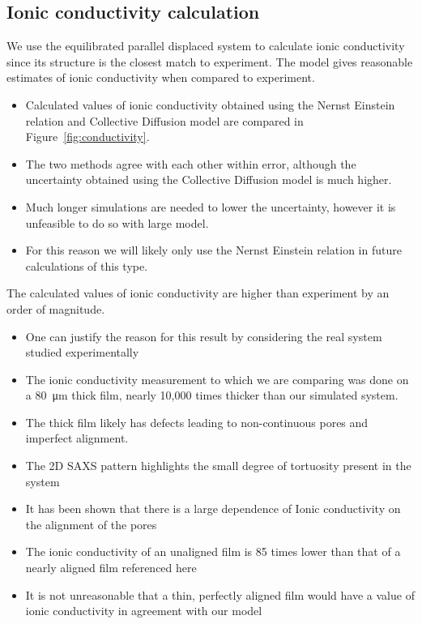 \documentclass{article}
\begin{document}
  \subsection*{Ionic conductivity calculation}

  We use the equilibrated parallel displaced system to calculate ionic 
  conductivity since its structure is the closest match to experiment.
  The model gives reasonable estimates of ionic conductivity when compared to 
  experiment.
  \begin{itemize}
  	\item Calculated values of ionic conductivity obtained using the Nernst 
	Einstein relation and Collective Diffusion model are compared in 
	Figure~\ref{fig:conductivity}.
	\item The two methods agree with each other within error, although the 
	uncertainty obtained using the Collective Diffusion model is much higher.
	\item Much longer simulations are needed to lower the uncertainty, however it
	is unfeasible to do so with large model. 
	\item For this reason we will likely only use the Nernst Einstein relation
	in future calculations of this type. 
  \end{itemize}

  The calculated values of ionic conductivity are higher than experiment by an
  order of magnitude. 
  \begin{itemize}
	\item One can justify the reason for this result by considering the 
	real system studied experimentally
	\item The ionic conductivity measurement to which we are comparing was done
	on a \SI{80}{\micro\metre} thick film, nearly 10,000 times thicker than 
        our simulated system. 
	\item The thick film likely has defects leading to non-continuous pores and
	imperfect alignment.
	\item The 2D SAXS pattern highlights the small degree of tortuosity present
	in the system  %
	\item It has been shown that there is a large dependence of Ionic conductivity
	on the alignment of the pores
	\item The ionic conductivity of an unaligned film is 85 times lower than that
	of a nearly aligned film referenced here  %
	\item It is not unreasonable that a thin, perfectly aligned film would have 
	a value of ionic conductivity in agreement with our model
  \end{itemize}
\end{document}
